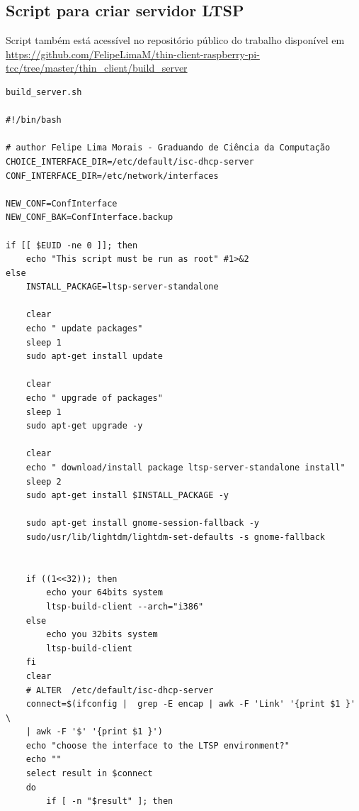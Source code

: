 \documentclass[
	12pt,				%
	openright,			%
	twoside,			%
	a4paper,			%
	chapter=TITLE,		%
	english,			%
	brazil				%
	]{abntex2}
\begin{document}

\begin{apendicesenv}

\partapendices

\chapter{Script para criar servidor LTSP}
\label{script:servidor}
Script também está acessível no repositório público do trabalho disponível em	 \url{https://github.com/FelipeLimaM/thin-client-raspberry-pi-tcc/tree/master/thin_client/build_server}

\begin{verbatim}
build_server.sh

#!/bin/bash

# author Felipe Lima Morais - Graduando de Ciência da Computação
CHOICE_INTERFACE_DIR=/etc/default/isc-dhcp-server
CONF_INTERFACE_DIR=/etc/network/interfaces

NEW_CONF=ConfInterface
NEW_CONF_BAK=ConfInterface.backup

if [[ $EUID -ne 0 ]]; then
    echo "This script must be run as root" #1>&2
else
    INSTALL_PACKAGE=ltsp-server-standalone
    
    clear
    echo " update packages"
    sleep 1
    sudo apt-get install update

    clear
    echo " upgrade of packages"
    sleep 1
    sudo apt-get upgrade -y 

    clear
    echo " download/install package ltsp-server-standalone install"
    sleep 2
    sudo apt-get install $INSTALL_PACKAGE -y

	sudo apt-get install gnome-session-fallback -y
	sudo/usr/lib/lightdm/lightdm-set-defaults -s gnome-fallback


    if ((1<<32)); then
        echo your 64bits system
        ltsp-build-client --arch="i386" 
    else
        echo you 32bits system
        ltsp-build-client
    fi
	clear
	# ALTER  /etc/default/isc-dhcp-server
	connect=$(ifconfig |  grep -E encap | awk -F 'Link' '{print $1 }' \
	| awk -F '$' '{print $1 }')
	echo "choose the interface to the LTSP environment?"
	echo ""	
	select result in $connect
	do
		if [ -n "$result" ]; then	
			

\end{verbatim}
\end{apendicesenv}
\end{document}
